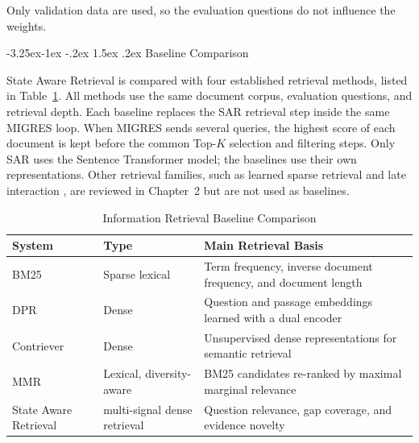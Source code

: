 \documentclass[12pt,a4paper]{report}
\makeatletter
\renewcommand\subsection{\@startsection{subsection}{2}{\z@}%
    {-3.25ex\@plus -1ex \@minus -.2ex}%
    {1.5ex \@plus .2ex}%
    {\normalfont\fontsize{14}{17}\selectfont\bfseries}}
\makeatother
\begin{document}
Only validation data are used, so the evaluation questions do not influence the weights.

\subsection{Baseline Comparison}

State Aware Retrieval is compared with four established retrieval methods, listed in Table~\ref{tab:baseline-comparison}. All methods use the same document corpus, evaluation questions, and retrieval depth. Each baseline replaces the SAR retrieval step inside the same MIGRES loop. When MIGRES sends several queries, the highest score of each document is kept before the common Top-$K$ selection and filtering steps. Only SAR uses the Sentence Transformer model; the baselines use their own representations. Other retrieval families, such as learned sparse retrieval \cite{formal2021splade} and late interaction \cite{khattab2020colbert,santhanam2022colbertv2}, are reviewed in Chapter~2 but are not used as baselines.

\begin{table}[H]
\centering
\caption{Information Retrieval Baseline Comparison}
\label{tab:baseline-comparison}
\renewcommand{\arraystretch}{1.2}
\begin{tabular}{|p{1.55in}|p{1.40in}|p{3.10in}|}
\hline
\textbf{System} & \textbf{Type} & \textbf{Main Retrieval Basis} \\ \hline
BM25 & Sparse lexical &
Term frequency, inverse document frequency, and document length
\cite{robertson2009bm25} \\ \hline

DPR & Dense &
Question and passage embeddings learned with a dual encoder
\cite{karpukhin2020dpr} \\ \hline

Contriever & Dense &
Unsupervised dense representations for semantic retrieval
\cite{izacard2022contriever} \\ \hline

MMR & Lexical, diversity-aware &
BM25 candidates re-ranked by maximal marginal relevance
\cite{carbonell1998mmr} \\ \hline

State Aware Retrieval & multi-signal dense retrieval &
Question relevance, gap coverage, and evidence novelty \\ \hline
\end{tabular}
\end{table}
\end{document}
